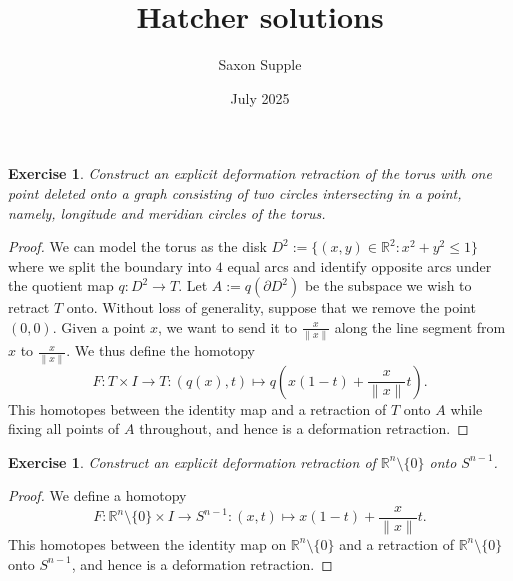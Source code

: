 \documentclass{article}
\title{Hatcher solutions}
\author{Saxon Supple}
\date{July 2025}
\newtheorem{exercise}[theorem]{Exercise}
\begin{document}
\maketitle
\begin{exercise}
Construct an explicit deformation retraction of the torus with one point deleted onto a graph consisting of two circles intersecting in a point, namely, longitude and meridian circles of the torus.
\end{exercise}
\begin{proof}
We can model the torus as the disk $D^2:=\{(x,y)\in\mathbb{R}^2:x^2+y^2\leq 1\}$ where we split the boundary into $4$ equal arcs and identify opposite arcs under the quotient map $q:D^2\to T$. Let $A:=q(\partial D^2)$ be the subspace we wish to retract $T$ onto. Without loss of generality, suppose that we remove the point $(0,0)$. Given a point $x$, we want to send it to $\frac{x}{\|x\|}$ along the line segment from $x$ to $\frac{x}{\|x\|}$. We thus define the homotopy \[F:T\times I\to T:(q(x),t)\mapsto q\left(x(1-t)+\frac{x}{\|x\|}t\right).\] This homotopes between the identity map and a retraction of $T$ onto $A$ while fixing all points of $A$ throughout, and hence is a deformation retraction.
\end{proof}

\begin{exercise}
Construct an explicit deformation retraction of $\mathbb{R}^n\setminus\{0\}$ onto $S^{n-1}$.
\end{exercise}
\begin{proof}
We define a homotopy \[F:\mathbb{R}^n\setminus\{0\}\times I\to S^{n-1}:(x,t)\mapsto x(1-t)+\frac{x}{\|x\|}t.\] This homotopes between the identity map on $\mathbb{R}^n\setminus\{0\}$ and a retraction of $\mathbb{R}^n\setminus\{0\}$ onto $S^{n-1}$, and hence is a deformation retraction.
\end{proof}
\end{document}
